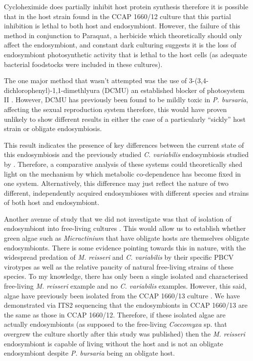 Cycloheximide does partially inhibit host protein synthesis
\citep{weis1984effect,Kodama2007,Kodama2008,Kodama2009a}
therefore it is possible that in the host strain found in the
CCAP 1660/12 culture that this partial inhibition is lethal to both
host and endosymbiont. However, the failure of this method in conjunction
to Paraquat, a herbicide which theoretically should only affect the endosymbiont, 
and constant dark culturing suggests it is the loss of endosymbiont
photosynthetic activity that is lethal to the host cells (as adequate bacterial
foodstocks were included in these cultures).   

The one major method that wasn't attempted was the use of 3-(3,4-dichlorophenyl)-1,1-dimethlyura (DCMU)
an established blocker of photosystem II \citep{VanGorkom1974}. 
However, DCMU has previously been found to be mildly toxic in \textit{P. bursaria}, 
affecting the sexual reproduction system \citep{Miwa2009} therefore, this would
have proven unlikely to show different results in either the case of a particularly 
``sickly'' host strain or obligate endosymbiosis. 


This result indicates the presence of key differences between the current state of this
endosymbiosis and the previously studied \textit{C. variabilis} endosymbiosis
studied by \citep{Kodama2014c}.  Therefore, a comparative analysis of these systems
could theoretically shed light on the mechanism by which metabolic co-dependence
has become fixed in one system. Alternatively, this difference may just reflect the nature of two
different, independently acquired endosymbioses with different species and strains
of both host and endosymbiont. 


Another avenue of study that we did not investigate was that of
isolation of endosymbiont into free-living cultures \citep{Achilles-Day2013a}. This would allow
us to establish whether green algae such as \textit{Micractinium} that have obligate
hosts are themselves obligate endosymbionts.  There is some evidence pointing
towards this in nature, with the widespread predation of \textit{M. reisseri}
and \textit{C. variabilis} by their specific PBCV virotypes as well as the relative
paucity of natural free-living strains of these species.  To my knowledge, there
has only been a single isolated and characterised free-living \textit{M. reisseri} \citep{Abou-Shanab2014}
example and no \textit{C. variabilis} examples.  However,
this said, algae have previously been isolated from the CCAP 1660/13 culture \citep{Achilles-Day2013a}.
We have demonstrated via ITS2 sequencing that the endosymbionts in CCAP 1660/13 are the same
as those in CCAP 1660/12. Therefore, if these isolated algae are actually endosymbionts (as supposed
to the free-living \textit{Coccomyxa} sp. that overgrew the culture shortly after this study
was published) then the \textit{M. reisseri} endosymbiont is capable of living without
the host and is not an obligate endosymbiont despite \textit{P. bursaria} being an obligate host.  

